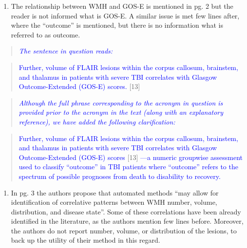 \documentclass[12pt,]{article}
\providecommand{\tightlist}{%
  \setlength{\itemsep}{0pt}\setlength{\parskip}{0pt}}
\begin{document}
\begin{enumerate}
\def\labelenumi{\arabic{enumi}.}
\setcounter{enumi}{7}
\tightlist
\item
  The relationship between WMH and GOS-E is mentioned in pg. 2 but the
  reader is not informed what is GOS-E. A similar issue is met few lines
  after, where the ``outcome'' is mentioned, but there is no information
  what is referred to as outcome.
\end{enumerate}

\begin{quote}
\emph{\textcolor{blue}{The sentence in question reads:}}
\end{quote}

\begin{quote}
\textcolor{blue}{Further, volume of FLAIR lesions within the corpus
callosum, brainstem, and thalamus in patients with severe TBI correlates
with Glasgow Outcome-Extended (GOS-E) scores.} {[}13{]}
\end{quote}

\begin{quote}
\emph{\textcolor{blue}{Although the full phrase corresponding to the acronym
in question is provided prior to the acronym in the text (along with an
explanatory reference), we have added the following clarification:}}
\end{quote}

\begin{quote}
\textcolor{blue}{Further, volume of FLAIR lesions within the corpus
callosum, brainstem, and thalamus in patients with severe TBI correlates
with Glasgow Outcome-Extended (GOS-E) scores} {[}13{]}
\textcolor{blue}{---a numeric groupwise assessment used to
classify ``outcome'' in TBI patients where ``outcome'' refers to the
spectrum of possible prognoses from death to disability to recovery.}
\end{quote}

\begin{enumerate}
\def\labelenumi{\arabic{enumi}.}
\setcounter{enumi}{8}
\tightlist
\item
  In pg. 3 the authors propose that automated methods ``may allow for
  identification of correlative patterns between WMH number, volume,
  distribution, and disease state''. Some of these correlations have
  been already identified in the literature, as the authors mention few
  lines before. Moreover, the authors do not report number, volume, or
  distribution of the lesions, to back up the utility of their method in
  this regard.
\end{enumerate}
\end{document}
